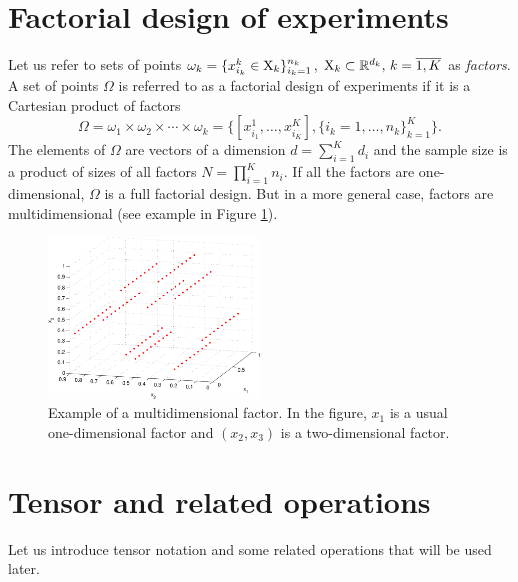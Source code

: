 

\section{Factorial design of experiments}
Let us refer to sets of points
${\omega_k = \{ x_{i_k}^k \in {\rm X}_k \}_{i_k = 1}^{n_k}}$,
${\rm X}_k \subset \mathbb{R}^{d_k}, \, k = \overline{1, K}$ as {\em factors}.
A set of points $\Omega$ is referred to as a factorial design of experiments
if it is a Cartesian product of factors
\begin{equation}
  \label{eq:factorial_design}
    \Omega = \omega_1 \times \omega_2 \times \cdots \times \omega_k =
    \{ [x_{i_1}^1, \ldots, x_{i_K}^K], \{ i_k = 1, \ldots, n_k\}_{k = 1}^K \}.
\end{equation}
The elements of $\Omega$ are vectors of a dimension $d = \sum_{i = 1}^K d_i$ and
the sample size is a product of sizes of all factors $N = \prod_{i = 1}^K n_i$.
If all the factors are one-dimensional, $\Omega$ is a full factorial design.
But in a more general case, factors are multidimensional (see example in Figure \ref{fig:multidim_factor}).

\begin{figure}
  \centering
  \includegraphics[width=0.5\textwidth]{figures/gp_on_grid/multidim_factor.pdf}
  \caption{Example of a multidimensional factor. In the figure, $x_1$ is a usual one-dimensional factor
  and $(x_2, x_3)$ is a two-dimensional factor.}
  \label{fig:multidim_factor}
\end{figure}


\section{Tensor and related operations}
Let us introduce tensor notation and some related operations that will be used
later.

